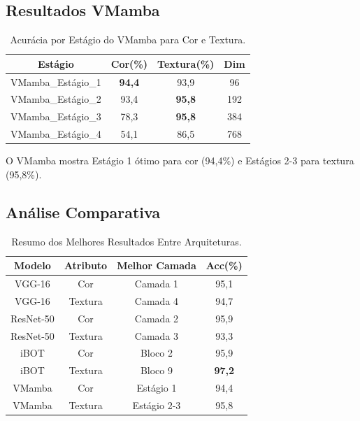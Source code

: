 \documentclass[conference]{IEEEtran}
\begin{document}
\subsection{Resultados VMamba}

\begin{table}[htbp]
\caption{Acurácia por Estágio do VMamba para Cor e Textura.}
\begin{center}
\begin{tabular}{|c|c|c|c|}
\hline
\textbf{Estágio} & \textbf{Cor(\%)} & \textbf{Textura(\%)} & \textbf{Dim}\\
\hline
VMamba\_Estágio\_1 & \textbf{94,4} & 93,9 & 96 \\
\hline
VMamba\_Estágio\_2 & 93,4 & \textbf{95,8} & 192 \\
\hline
VMamba\_Estágio\_3 & 78,3 & \textbf{95,8} & 384 \\
\hline
VMamba\_Estágio\_4 & 54,1 & 86,5 & 768 \\
\hline
\end{tabular}
\label{tab4}
\end{center}
\end{table}

O VMamba mostra Estágio 1 ótimo para cor (94,4\%) e Estágios 2-3 para textura (95,8\%).

\subsection{Análise Comparativa}

\begin{table}[htbp]
\caption{Resumo dos Melhores Resultados Entre Arquiteturas.}
\begin{center}
\begin{tabular}{|c|c|c|c|}
\hline
\textbf{Modelo} & \textbf{Atributo} & \textbf{Melhor Camada} & \textbf{Acc(\%)}\\
\hline
VGG-16 & Cor & Camada 1 & 95,1 \\
\hline
VGG-16 & Textura & Camada 4 & 94,7 \\
\hline
ResNet-50 & Cor & Camada 2 & 95,9 \\
\hline
ResNet-50 & Textura & Camada 3 & 93,3 \\
\hline
iBOT & Cor & Bloco 2 & 95,9 \\
\hline
iBOT & Textura & Bloco 9 & \textbf{97,2} \\
\hline
VMamba & Cor & Estágio 1 & 94,4 \\
\hline
VMamba & Textura & Estágio 2-3 & 95,8 \\
\hline
\end{tabular}
\label{tab5}
\end{center}
\end{table}
\end{document}

